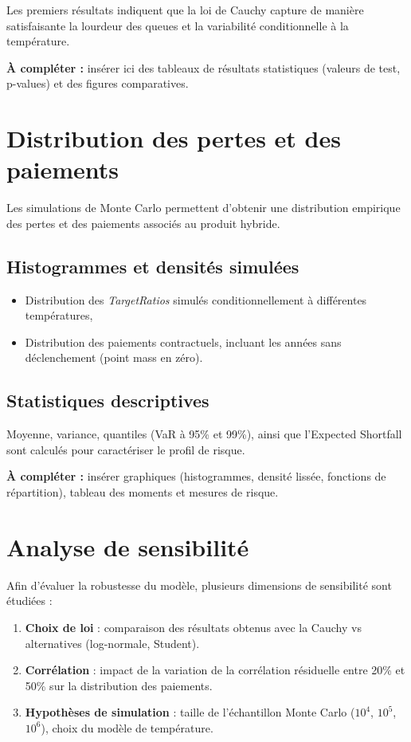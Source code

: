 \documentclass[11pt,a4paper,openright,twoside]{report}
\begin{document}
Les premiers résultats indiquent que la loi de Cauchy capture de manière satisfaisante la lourdeur des queues et la variabilité conditionnelle à la température.  

\textbf{À compléter :} insérer ici des tableaux de résultats statistiques (valeurs de test, p-values) et des figures comparatives.

\section{Distribution des pertes et des paiements}
Les simulations de Monte Carlo permettent d’obtenir une distribution empirique des pertes et des paiements associés au produit hybride.  

\subsection{Histogrammes et densités simulées}
\begin{itemize}
    \item Distribution des \textit{TargetRatios} simulés conditionnellement à différentes températures,
    \item Distribution des paiements contractuels, incluant les années sans déclenchement (point mass en zéro).
\end{itemize}

\subsection{Statistiques descriptives}
Moyenne, variance, quantiles (VaR à 95\% et 99\%), ainsi que l’Expected Shortfall sont calculés pour caractériser le profil de risque.  

\textbf{À compléter :} insérer graphiques (histogrammes, densité lissée, fonctions de répartition), tableau des moments et mesures de risque.

\section{Analyse de sensibilité}
Afin d’évaluer la robustesse du modèle, plusieurs dimensions de sensibilité sont étudiées :  
\begin{enumerate}
    \item \textbf{Choix de loi} : comparaison des résultats obtenus avec la Cauchy vs alternatives (log-normale, Student).
    \item \textbf{Corrélation} : impact de la variation de la corrélation résiduelle entre 20\% et 50\% sur la distribution des paiements.
    \item \textbf{Hypothèses de simulation} : taille de l’échantillon Monte Carlo ($10^4$, $10^5$, $10^6$), choix du modèle de température.
\end{enumerate}
\end{document}
